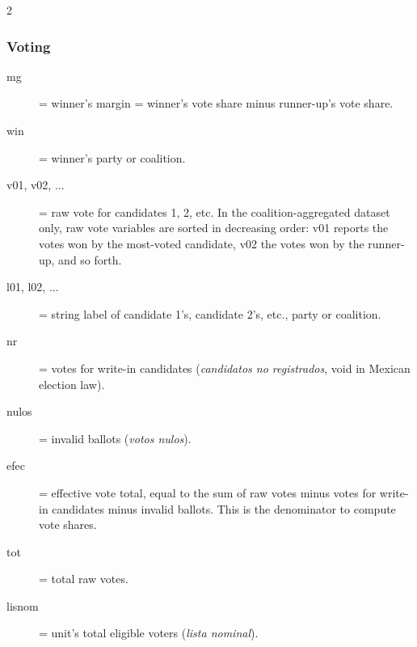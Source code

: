 \documentclass[letter,12pt]{article}
\begin{document}
\begin{singlespace}
\begin{multicols}{2}
\begin{footnotesize}
\subsubsection{Voting}
\begin{description}
\item[mg] = winner's margin = winner's vote share minus runner-up's vote share.
\item[win] = winner's party or coalition.
\item[v01, v02, ...] = raw vote for candidates 1, 2, etc. In the coalition-aggregated dataset only, raw vote variables are sorted in decreasing order: v01 reports the votes won by the most-voted candidate, v02 the votes won by the runner-up, and so forth.
\item[l01, l02, ...] = string label of candidate 1's, candidate 2's, etc., party or coalition.
\item[nr] = votes for write-in candidates (\emph{candidatos no registrados}, void in Mexican election law).
\item[nulos] = invalid ballots (\emph{votos nulos}).
\item[efec] = effective vote total, equal to the sum of raw votes minus votes for write-in candidates minus invalid ballots. This is the denominator to compute vote shares.
\item[tot] = total raw votes.
\item[lisnom] = unit's total eligible voters (\emph{lista nominal}).
\end{description}

\end{footnotesize}
\end{multicols}
\end{singlespace}
\end{document}
